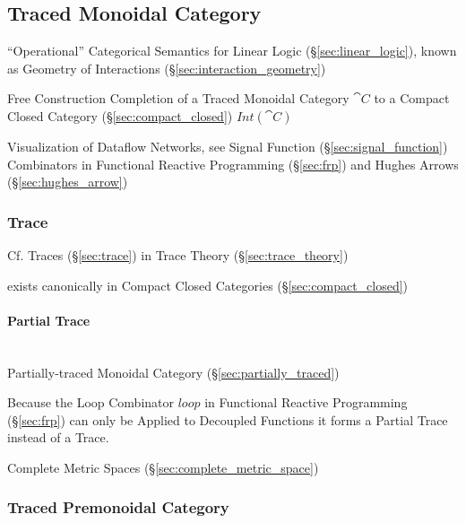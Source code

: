 \subsection{Traced Monoidal Category}\label{sec:traced_monoidal}

``Operational'' Categorical Semantics for Linear Logic
(\S\ref{sec:linear_logic}), known as Geometry of Interactions
(\S\ref{sec:interaction_geometry})

Free Construction Completion of a Traced Monoidal Category $\cat{C}$
to a Compact Closed Category (\S\ref{sec:compact_closed})
$Int(\cat{C})$

Visualization of Dataflow Networks, see Signal Function
(\S\ref{sec:signal_function}) Combinators in Functional Reactive
Programming (\S\ref{sec:frp}) and Hughes Arrows
(\S\ref{sec:hughes_arrow})



\subsubsection{Trace}\label{sec:category_trace}

\fist Cf. Traces (\S\ref{sec:trace}) in Trace Theory
(\S\ref{sec:trace_theory})

exists canonically in Compact Closed Categories
(\S\ref{sec:compact_closed}) %



\paragraph{Partial Trace}\label{sec:partial_trace}
\hfill \\

Partially-traced Monoidal Category (\S\ref{sec:partially_traced})

Because the Loop Combinator $loop$ in Functional Reactive Programming
(\S\ref{sec:frp}) can only be Applied to Decoupled Functions it forms
a Partial Trace instead of a Trace.

Complete Metric Spaces (\S\ref{sec:complete_metric_space})



\subsubsection{Traced Premonoidal Category}
\label{sec:traced_premonoidal}

